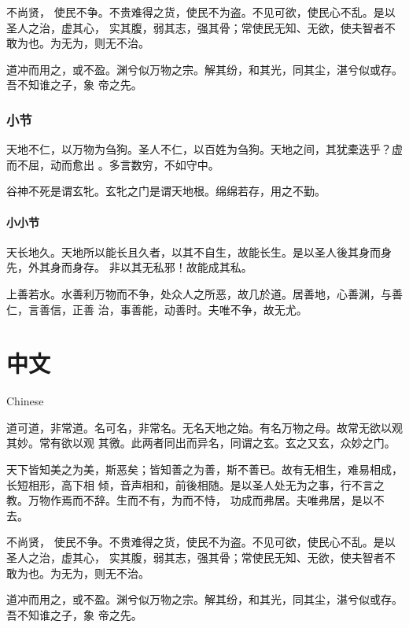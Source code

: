 \documentclass[a4paper, twoside, openany, extrafontsizes]{dlutthesis}
\begin{document}
不尚贤， 使民不争。不贵难得之货，使民不为盗。不见可欲，使民心不乱。是以圣人之治，虚其心，
实其腹，弱其志，强其骨；常使民无知、无欲，使夫智者不敢为也。为无为，则无不治。

道冲而用之，或不盈。渊兮似万物之宗。解其纷，和其光，同其尘，湛兮似或存。吾不知谁之子，象
帝之先。

\subsection{小节}
%
\label{sub:subsection}

天地不仁，以万物为刍狗。圣人不仁，以百姓为刍狗。天地之间，其犹橐迭乎？虚而不屈，动而愈出
。多言数穷，不如守中。

谷神不死是谓玄牝。玄牝之门是谓天地根。绵绵若存，用之不勤。

\subsubsection{小小节}
%
\label{subs:subsubsection}

天长地久。天地所以能长且久者，以其不自生，故能长生。是以圣人後其身而身先，外其身而身存。
非以其无私邪！故能成其私。

上善若水。水善利万物而不争，处众人之所恶，故几於道。居善地，心善渊，与善仁，言善信，正善
治，事善能，动善时。夫唯不争，故无尤。


\chapter{中文}{Chinese} %


道可道，非常道。名可名，非常名。无名天地之始。有名万物之母。故常无欲以观其妙。常有欲以观
其徼。此两者同出而异名，同谓之玄。玄之又玄，众妙之门。

天下皆知美之为美，斯恶矣；皆知善之为善，斯不善已。故有无相生，难易相成，长短相形，高下相
倾，音声相和，前後相随。是以圣人处无为之事，行不言之教。万物作焉而不辞。生而不有，为而不恃，
功成而弗居。夫唯弗居，是以不去。

不尚贤， 使民不争。不贵难得之货，使民不为盗。不见可欲，使民心不乱。是以圣人之治，虚其心，
实其腹，弱其志，强其骨；常使民无知、无欲，使夫智者不敢为也。为无为，则无不治。

道冲而用之，或不盈。渊兮似万物之宗。解其纷，和其光，同其尘，湛兮似或存。吾不知谁之子，象
帝之先。
\end{document}
